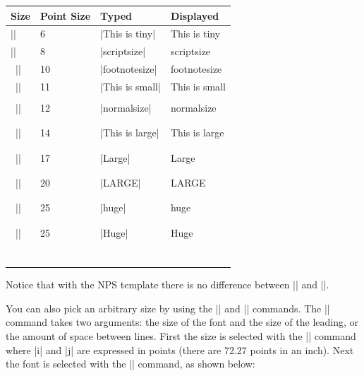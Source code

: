 \begin{center}
\begin{tabular}{llll}
Size          & Point Size & Typed & Displayed  \\\hline
|\tiny|       &  6 & |{\tiny This is tiny}| & {\tiny This is tiny}\\
|\scriptsize| &  8 & |{\scriptsize scriptsize}| & {\scriptsize scriptsize} \\\
|\footnotesize| & 10 & |{\footnotesize footnotesize}| & {\footnotesize footnotesize} \\\
|\small|        & 11 & |{\small This is small}| & {\small This is small} \\\\\
|\normalsize|   & 12 & |{\normalsize normalsize}| & {\normalsize  normalsize} \\\\\\\
|\large|        & 14 & |{\large This is large}| & {\large This is large} \\\\\\\
|\Large|        & 17 & |{\Large Large}| & {\Large Large} \\\\\\\
|\LARGE|        & 20 & |{\LARGE LARGE}| & {\LARGE LARGE} \\\\\\\
|\huge|         & 25 & |{\huge huge}| & {\huge huge} \\\\\\\
|\Huge|         & 25 & |{\Huge Huge}| & {\Huge Huge} \\\\\\\
\end{tabular}
\end{center}

Notice that with the NPS template there is no difference between
|\huge| and |\Huge|.

You can also pick an arbitrary size by using the |\fontsize| and |\selectfont|
commands. The |\fontsize| command takes two arguments: the size of the font and
the size of the leading, or the amount of space between lines. First the size
is selected with the |\fontsize{i}{j}| command where |i| and |j| are expressed
in points (there are 72.27 points in an inch). Next the font is selected with
the |\selectfont| command, as shown below:

